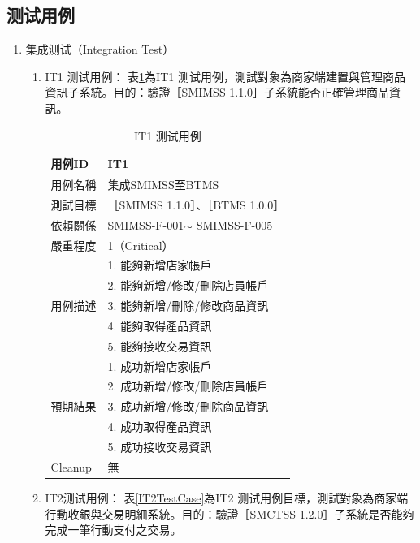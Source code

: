 		\subsection{测试用例}
			\begin{enumerate}

			\item 集成测试（Integration Test）
				\begin{enumerate}

				\item IT1 测试用例：
					表\ref{IT1TestCase}為IT1 测试用例，測試對象為商家端建置與管理商品資訊子系統。目的：驗證［SMIMSS 1.1.0］子系統能否正確管理商品資訊。

					\begin{table}[!htbp]
					\centering
					\caption{IT1 测试用例}
					\label{IT1TestCase}
					\begin{tabular}{|l|l|}
					\hline
					用例ID & IT1 \\ \hline
					用例名稱 & 集成SMIMSS至BTMS \\ \hline
					測試目標 & {［}SMIMSS 1.1.0{］}、{［}BTMS 1.0.0{］} \\ \hline
					依賴關係 & SMIMSS-F-001$\sim$ SMIMSS-F-005 \\ \hline
					嚴重程度 & 1（Critical） \\ \hline
					\multirow{5}{*}{用例描述} & 1.     能夠新增店家帳戶 \\ \cline{2-2} 
					 & 2.     能夠新增/修改/刪除店員帳戶 \\ \cline{2-2} 
					 & 3.     能夠新增/刪除/修改商品資訊 \\ \cline{2-2} 
					 & 4.     能夠取得產品資訊 \\ \cline{2-2} 
					 & 5.     能夠接收交易資訊 \\ \hline
					\multirow{5}{*}{預期結果} & 1.     成功新增店家帳戶 \\ \cline{2-2} 
					 & 2.     成功新增/修改/刪除店員帳戶 \\ \cline{2-2} 
					 & 3.     成功新增/修改/刪除商品資訊 \\ \cline{2-2} 
					 & 4.     成功取得產品資訊 \\ \cline{2-2} 
					 & 5.     成功接收交易資訊 \\ \hline
					Cleanup & 無 \\ \hline
					\end{tabular}
					\end{table}


				\item IT2测试用例：
					表\ref{IT2TestCase}為IT2 测试用例目標，測試對象為商家端行動收銀與交易明細系統。目的：驗證［SMCTSS 1.2.0］子系統是否能夠完成一筆行動支付之交易。


\end{enumerate}
\end{enumerate}
